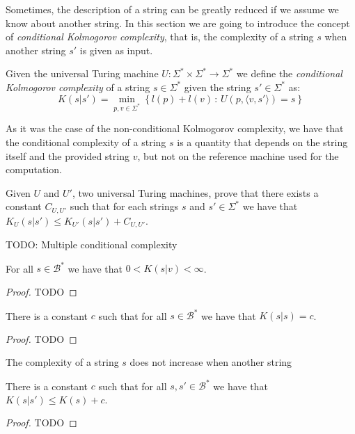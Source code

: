 Sometimes, the description of a string can be greatly reduced if we assume we know about another string. In this section we are going to introduce the concept of \emph{conditional Kolmogorov complexity}, that is, the complexity of a string $s$ when another string $s'$ is given as input.

\begin{definition}
Given the universal Turing machine $U:\Sigma^{\ast}\times\Sigma^{\ast}\rightarrow\Sigma^{\ast}$ we define the \emph{conditional Kolmogorov complexity} of a string $s\in\Sigma^{\ast}$ given the string $s'\in\Sigma^{\ast}$ as:
\[
K(s|s')=\min_{p,v\in\Sigma^{\ast}}\left\{l(p) + l(v)\,:\, U(p,\langle v, s' \rangle)=s\right\}
\]
\end{definition}

As it was the case of the non-conditional Kolmogorov complexity, we have that the conditional complexity of a string $s$ is a quantity that depends on the string itself and the provided string $v$, but not on the reference machine used for the computation.

\begin{exercise}
Given $U$ and $U'$, two universal Turing machines, prove that there exists a constant $C_{U, U'}$ such that for each strings $s$ and $s' \in \Sigma^{\ast}$ we have that $K_{U}(s|s') \leq K_{U'}(s|s') + C_{U, U'}$.
\end{exercise}

{\color{red} TODO: Multiple conditional complexity}

\begin{proposition}
For all $s\in\mathcal{B}^{\ast}$ we have that $0 < K(s | v) < \infty$.
\end{proposition}
\begin{proof}
{\color{red} TODO}
\end{proof}


\begin{proposition}
There is a constant $c$ such that for all $s\in\mathcal{B}^{\ast}$ we have that $K(s | s ) = c$.
\end{proposition}
\begin{proof}
{\color{red} TODO}
\end{proof}

The complexity of a string $s$ does not increase when another string

\begin{proposition}
\label{prop:kolmogorov_conditional}
There is a constant $c$ such that for all $s, s'\in\mathcal{B}^{\ast}$ we have that $K(s | s' ) \leq K(s) + c$.
\end{proposition}
\begin{proof}
{\color{red} TODO}
\end{proof}

